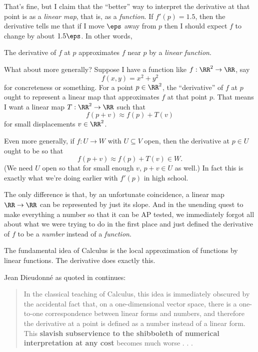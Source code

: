 That's fine, but I claim that the ``better'' way to interpret
the derivative at that point is as a \emph{linear map},
that is, as a \emph{function}.
If $f'(p) = 1.5$,
then the derivative tells me that if I move $\eps$ away from $p$
then I should expect $f$ to change by about $1.5\eps$.
In other words,
\begin{moral}
The derivative of $f$ at $p$ approximates $f$ near $p$ by a \emph{linear function}.
\end{moral}

What about more generally?
Suppose I have a function like $f : \RR^2 \to \RR$, say 
\[ f(x,y) = x^2+y^2 \]
for concreteness or something.
For a point $p \in \RR^2$, the ``derivative'' of $f$ at $p$ ought to represent a linear map
that approximates $f$ at that point $p$.
That means I want a linear map $T : \RR^2 \to \RR$ such that
\[ f(p + v) \approx f(p) + T(v) \]
for small displacements $v \in \RR^2$.

Even more generally, if $f : U \to W$ with $U \subseteq V$ open,
then the derivative at $p \in U$ ought to be so that
\[ f(p + v) \approx f(p) + T(v) \in W. \]
(We need $U$ open so that for small enough $v$, $p+v \in U$ as well.)
In fact this is exactly what we're doing earlier with $f'(p)$ in high school.


The only difference is that, by an unfortunate coincidence,
a linear map $\RR \to \RR$ can be represented by just its slope.
And in the unending quest to make everything a number so that it can be AP tested,
we immediately forgot all about what we were trying to do in the first place
and just defined the derivative of $f$ to be a \emph{number} instead of a \emph{function}.

\begin{moral}
	The fundamental idea of Calculus is the local approximation of functions by linear functions.
	The derivative does exactly this.
\end{moral}
Jean Dieudonn\'e as quoted in \cite{ref:pugh} continues:
\begin{quote}
	In the classical teaching of Calculus, this idea is immediately obscured
	by the accidental fact that, on a one-dimensional vector space,
	there is a one-to-one correspondence between linear forms and numbers,
	and therefore the derivative at a point is defined as a number instead of a linear form.
	This \textbf{slavish subservience to the shibboleth of numerical interpretation at any cost}
	becomes much worse . . .
\end{quote}

